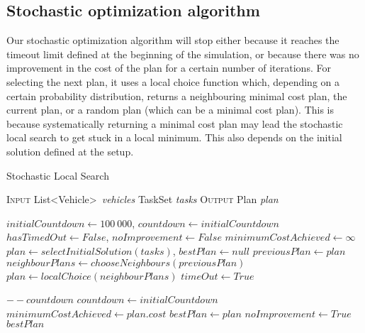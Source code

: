 \documentclass[10pt]{article}
\begin{document}
\subsection{Stochastic optimization algorithm}
Our stochastic optimization algorithm will stop either because it reaches the timeout limit defined at the beginning of the simulation, or because there was no improvement in the cost of the plan for a certain number of iterations.
For selecting the next plan, it uses a local choice function which, depending on a certain probability distribution, returns a neighbouring minimal cost plan, the current plan, or a random plan (which can be a minimal cost plan). This is because systematically returning a minimal cost plan may lead the stochastic local search to get stuck in a local minimum. This also depends on the initial solution defined at the setup.

\begin{algorithm}[h]
\caption{Stochastic Local Search}
\begin{algorithmic}[0]
\Statex \textsc{Input}
\Statex \hspace{\algorithmicindent} List\textless Vehicle\textgreater\ \textit{vehicles} 
\Statex \hspace{\algorithmicindent} TaskSet \textit{tasks} 
\Statex \textsc{Output}
\Statex \hspace{\algorithmicindent} Plan \textit{plan} 

\State
\State $initialCountdown \gets 100\ 000$, $countdown \gets initialCountdown$ 
\State $hasTimedOut \gets False$, $noImprovement \gets False$
\State $minimumCostAchieved \gets  \infty$
\State $plan \gets  selectInitialSolution(tasks)$, $bestPlan \gets null$
\State
{}
\State $previousPlan \gets plan$
\State $neighbourPlans \gets chooseNeighbours(previousPlan)$ 
\State $plan \gets localChoice(neighbourPlans)$ 
\State
{}  
	\State $timeOut \gets True$ 
\EndIf                          {}

	\State $--countdown$
\Else
	\State $countdown \gets initialCountdown$
	\State $minimumCostAchieved \gets plan.cost$
	\State $bestPlan \gets plan$
\EndIf
{}
	\State $noImprovement \gets True$
\EndIf
\EndWhile
\State \Return $bestPlan$
\end{algorithmic}
\end{algorithm}
\end{document}
